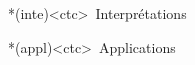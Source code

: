 \documentclass[../../main/main.tex]{subfiles}
\begin{document}
\begin{tcn}
	\begin{tcn}*(inte)<ctc>{\iconinte~Interprétations}
	\end{tcn}
	\begin{tcn}*(appl)<ctc>{\iconappl~Applications}
	\end{tcn}

\end{tcn}
\end{document}

